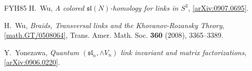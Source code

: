 \documentclass{compositio}
\theoremstyle{definition}
\numberwithin{equation}{section}
\begin{document}
\begin{thebibliography}{FYH{\etalchar{+}}85}
H.~Wu, \emph{A colored {$\mathfrak{sl}(N)$}-homology for links in {$S^3$}},
  \href{http://arxiv.org/abs/0907.0695}{[arXiv:0907.0695]}.

H.~Wu, \emph{Braids, {T}ransversal links and the {K}hovanov-{R}ozansky {T}heory},
  \href{http://arxiv.org/abs/math/0508064}{[math.GT/0508064]}, Trans. Amer. Math. Soc. \textbf{360}
  (2008), 3365--3389.

Y.~Yonezawa, \emph{Quantum {$(\mathfrak{sl}_n, \wedge V_n)$} link invariant and
  matrix factorizations},
  \href{http://arxiv.org/abs/0906.0220}{[arXiv:0906.0220]}.

\end{thebibliography}
\end{document}
